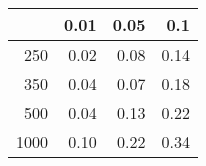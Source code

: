 % 
\begin{tabular}{rrrr}
  \hline
 & 0.01 & 0.05 & 0.1 \\ 
  \hline
250 & 0.02 & 0.08 & 0.14 \\ 
  350 & 0.04 & 0.07 & 0.18 \\ 
  500 & 0.04 & 0.13 & 0.22 \\ 
  1000 & 0.10 & 0.22 & 0.34 \\ 
   \hline
\end{tabular}
